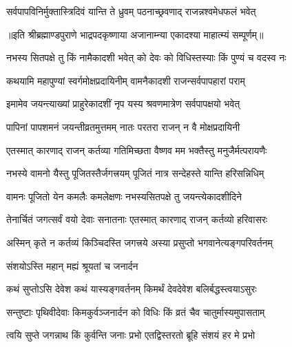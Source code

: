 \twolineshloka
{सर्वपापविनिर्मुक्तास्त्रिदिवं यान्ति ते ध्रुवम्}
{पठनाच्छ्रवणाद् राजन्नश्वमेधफलं भवेत्} %

॥इति श्रीब्रह्माण्डपुराणे भाद्रपदकृष्णाया अजानाम्न्या एकादश्या माहात्म्यं सम्पूर्णम्॥


\hyperref[sec:ekadashi_mahatmyam_vrata_raja]{\closesub}
\clearpage

\label{sec:vrata-raja-bhadrapada-shukla-padma}


\twolineshloka
{नभस्य सितपक्षे तु किं नामैकादशी भवेत्}
{को देवः को विधिस्तस्याः किं पुण्यं च वदस्व नः} %


\twolineshloka
{कथयामि महापुण्यां स्वर्गमोक्षप्रदायिनीम्}
{वामनैकादशी राजन्सर्वपापहारां पराम्} %

\twolineshloka
{इमामेव जयन्त्याख्यां प्राहुरेकादशीं नृप}
{यस्य श्रवणमात्रेण सर्वपापक्षयो भवेत्} %

\twolineshloka
{पापिनां पापशमनं जयन्तीव्रतमुत्तमम्}
{नातः परतरा राजन् न वै मोक्षप्रदायिनी} %

\twolineshloka
{एतस्मात् कारणाद् राजन् कर्तव्या गतिमिच्छता}
{वैष्णव मम भक्तैस्तु मनुजैर्मत्परायणैः} %

\twolineshloka
{नभस्ये वामनो यैस्तु पूजितस्तैर्जगत्त्रयम्}
{पूजितं नात्र सन्देहस्ते यान्ति हरिसन्निधिम्} %

\twolineshloka
{वामनः पूजितो येन कमलैः कमलेक्षणः}
{नभस्यसितपक्षे तु जयन्त्येकादशीदिने} %

\twolineshloka
{तेनार्चितं जगत्सर्वं वयो देवाः सनातनाः}
{एतस्मात् कारणाद् राजन् कर्तव्यो हरिवासरः} %

\twolineshloka
{अस्मिन् कृते न कर्तव्यं किञ्चिदस्ति जगत्त्रये}
{अस्या प्रसुप्तो भगवानेत्यङ्गपरिवर्तनम्} %



\onelineshloka
{संशयोऽस्ति महान् मह्यं श्रूयतां च जनार्दन} %

\twolineshloka
{कथं सुप्तोऽसि देवेश कथं यास्यङ्गवर्तनम्}
{किमर्थं देवदेवेश बलिर्बद्धस्त्वयाऽसुरः} %

\twolineshloka
{सन्तुष्टाः पृथिवीदेवाः किमकुर्वञ्जनार्दन}
{को विधिः किं व्रतं चैव चातुर्मास्यमुपासताम्} %

\twolineshloka
{त्वयि सुप्ते जगन्नाथ किं कुर्वन्ति जनाः प्रभो}
{एतद्विस्तरतो ब्रूहि संशयं हर मे प्रभो} %

